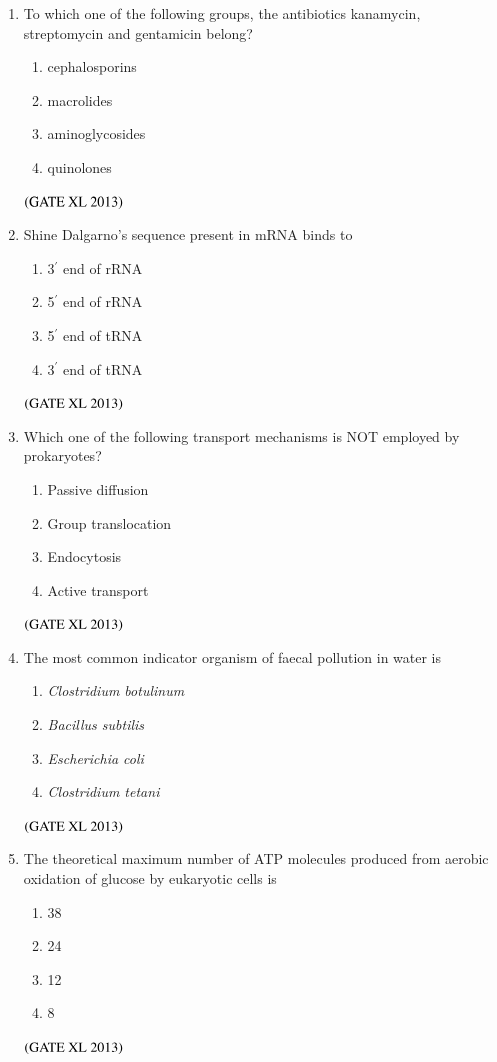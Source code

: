 \documentclass[journal]{IEEEtran}
\begin{document}
\begin{enumerate}
\begin{enumerate}
\item To which one of the following groups, the antibiotics kanamycin, streptomycin and gentamicin belong?
\begin{enumerate}
\item cephalosporins
\item macrolides
\item aminoglycosides
\item quinolones
\end{enumerate}
\hfill $\left(\text{GATE XL 2013}\right)$

\item Shine Dalgarno's sequence present in mRNA binds to
\begin{enumerate}
\item 3$^{\prime}$ end of rRNA
\item 5$^{\prime}$ end of rRNA
\item 5$^{\prime}$ end of tRNA
\item 3$^{\prime}$ end of tRNA
\end{enumerate}
\hfill $\left(\text{GATE XL 2013}\right)$

\item Which one of the following transport mechanisms is NOT employed by prokaryotes?
\begin{enumerate}
\item Passive diffusion
\item Group translocation
\item Endocytosis
\item Active transport
\end{enumerate}
\hfill $\left(\text{GATE XL 2013}\right)$

\item The most common indicator organism of faecal pollution in water is
\begin{enumerate}
\item \textit{Clostridium botulinum}
\item \textit{Bacillus subtilis}
\item \textit{Escherichia coli}
\item \textit{Clostridium tetani}
\end{enumerate}
\hfill $\left(\text{GATE XL 2013}\right)$

\item The theoretical maximum number of ATP molecules produced from aerobic oxidation of glucose by eukaryotic cells is
\begin{enumerate}
\item 38
\item 24
\item 12
\item 8
\end{enumerate}
\hfill $\left(\text{GATE XL 2013}\right)$


\end{enumerate}
\end{enumerate}
\end{document}

